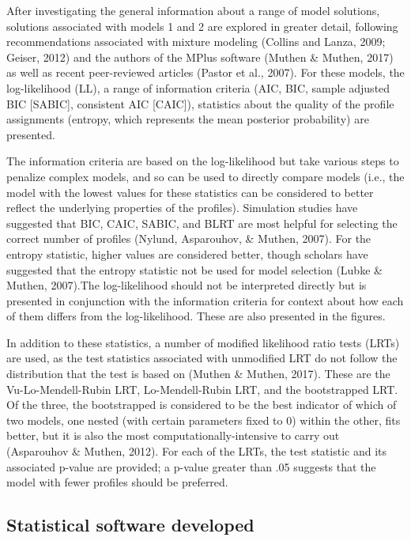 \documentclass[]{book}
\theoremstyle{definition}
\theoremstyle{definition}
\theoremstyle{definition}
\theoremstyle{remark}
\begin{document}
After investigating the general information about a range of model
solutions, solutions associated with models 1 and 2 are explored in
greater detail, following recommendations associated with mixture
modeling (Collins and Lanza, 2009; Geiser, 2012) and the authors of the
MPlus software (Muthen \& Muthen, 2017) as well as recent peer-reviewed
articles (Pastor et al., 2007). For these models, the log-likelihood
(LL), a range of information criteria (AIC, BIC, sample adjusted BIC
{[}SABIC{]}, consistent AIC {[}CAIC{]}), statistics about the quality of
the profile assignments (entropy, which represents the mean posterior
probability) are presented.

The information criteria are based on the log-likelihood but take
various steps to penalize complex models, and so can be used to directly
compare models (i.e., the model with the lowest values for these
statistics can be considered to better reflect the underlying properties
of the profiles). Simulation studies have suggested that BIC, CAIC,
SABIC, and BLRT are most helpful for selecting the correct number of
profiles (Nylund, Asparouhov, \& Muthen, 2007). For the entropy
statistic, higher values are considered better, though scholars have
suggested that the entropy statistic not be used for model selection
(Lubke \& Muthen, 2007).The log-likelihood should not be interpreted
directly but is presented in conjunction with the information criteria
for context about how each of them differs from the log-likelihood.
These are also presented in the figures.

In addition to these statistics, a number of modified likelihood ratio
tests (LRTs) are used, as the test statistics associated with unmodified
LRT do not follow the distribution that the test is based on (Muthen \&
Muthen, 2017). These are the Vu-Lo-Mendell-Rubin LRT, Lo-Mendell-Rubin
LRT, and the bootstrapped LRT. Of the three, the bootstrapped is
considered to be the best indicator of which of two models, one nested
(with certain parameters fixed to 0) within the other, fits better, but
it is also the most computationally-intensive to carry out (Asparouhov
\& Muthen, 2012). For each of the LRTs, the test statistic and its
associated p-value are provided; a p-value greater than .05 suggests
that the model with fewer profiles should be preferred.

\subsection{Statistical software
developed}\label{statistical-software-developed}
\end{document}
